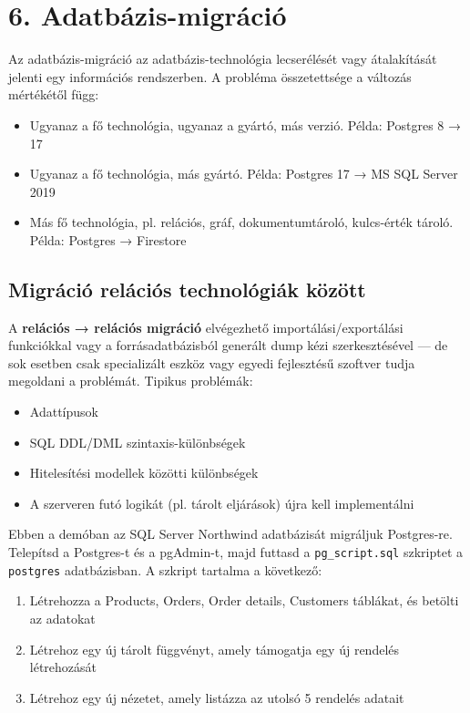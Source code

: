 \documentclass[
  magyar,
]{article}
\providecommand{\tightlist}{%
  \setlength{\itemsep}{0pt}\setlength{\parskip}{0pt}}
\begin{document}
\section{6. Adatbázis-migráció}\label{adatbuxe1zis-migruxe1ciuxf3}

Az adatbázis-migráció az adatbázis-technológia lecserélését vagy
átalakítását jelenti egy információs rendszerben. A probléma
összetettsége a változás mértékétől függ:

\begin{itemize}
\tightlist
\item
  Ugyanaz a fő technológia, ugyanaz a gyártó, más verzió. Példa:
  Postgres 8 → 17
\item
  Ugyanaz a fő technológia, más gyártó. Példa: Postgres 17 → MS SQL
  Server 2019
\item
  Más fő technológia, pl. relációs, gráf, dokumentumtároló, kulcs-érték
  tároló. Példa: Postgres → Firestore
\end{itemize}

\subsection{Migráció relációs technológiák
között}\label{migruxe1ciuxf3-reluxe1ciuxf3s-technoluxf3giuxe1k-kuxf6zuxf6tt}

A \textbf{relációs → relációs migráció} elvégezhető
importálási/exportálási funkciókkal vagy a forrásadatbázisból generált
dump kézi szerkesztésével --- de sok esetben csak specializált eszköz
vagy egyedi fejlesztésű szoftver tudja megoldani a problémát. Tipikus
problémák:

\begin{itemize}
\tightlist
\item
  Adattípusok
\item
  SQL DDL/DML szintaxis-különbségek
\item
  Hitelesítési modellek közötti különbségek
\item
  A szerveren futó logikát (pl. tárolt eljárások) újra kell
  implementálni
\end{itemize}

Ebben a demóban az SQL Server Northwind adatbázisát migráljuk
Postgres-re. Telepítsd a Postgres-t és a pgAdmin-t, majd futtasd a
\texttt{pg\_script.sql} szkriptet a \texttt{postgres} adatbázisban. A
szkript tartalma a következő:

\begin{enumerate}
\def\labelenumi{\arabic{enumi}.}
\tightlist
\item
  Létrehozza a Products, Orders, Order details, Customers táblákat, és
  betölti az adatokat
\item
  Létrehoz egy új tárolt függvényt, amely támogatja egy új rendelés
  létrehozását
\item
  Létrehoz egy új nézetet, amely listázza az utolsó 5 rendelés adatait
\end{enumerate}
\end{document}
